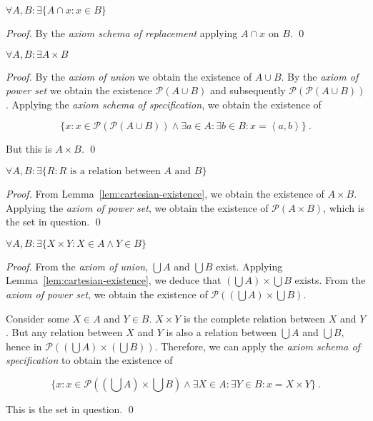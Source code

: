 \documentclass[11pt]{llncs}
\begin{document}
\begin{lemma}
  $\forall A, B: \exists \{A \cap x: x \in B\}$
\end{lemma}
\begin{proof}
  By the \emph{axiom schema of replacement} applying $A \cap x$ on $B$.
  \qed
\end{proof}

\begin{lemma}\label{lem:cartesian-existence}
  $\forall A, B: \exists A \times B$
\end{lemma}
\begin{proof}
  By the \emph{axiom of union} we obtain the existence of $A \cup B$. By the
  \emph{axiom of power set} we obtain the existence $\mathcal{P}(A \cup B)$ and
  subsequently $\mathcal{P}(\mathcal{P}(A \cup B))$. Applying the \emph{axiom
  schema of specification}, we obtain the existence of

  \[
    \{x: x \in \mathcal{P}(\mathcal{P}(A \cup B)) \land \exists a \in A: \exists b \in B: x = \left<a, b\right>\}
    ~.
  \]

  But this is $A \times B$.
  \qed
\end{proof}

\begin{lemma}\label{lem:simple-relations-existence}
  $\forall A, B: \exists \{R: R \text{ is a relation between } A \text{ and } B\}$
\end{lemma}
\begin{proof}
  From Lemma~\ref{lem:cartesian-existence}, we obtain the existence of
  $A \times B$. Applying the \emph{axiom of power set}, we obtain the existence
  of $\mathcal{P}(A \times B)$, which is the set in question.
  \qed
\end{proof}

\begin{lemma}\label{lem:all-relations-existence}
  $\forall A, B: \exists \{X \times Y: X \in A \land Y \in B\}$
\end{lemma}
\begin{proof}
  From the \emph{axiom of union}, $\bigcup A$ and $\bigcup B$ exist. Applying
  Lemma~\ref{lem:cartesian-existence}, we deduce that
  $(\bigcup A) \times \bigcup B$ exists. From the \emph{axiom of power set},
  we obtain the existence of $\mathcal{P}((\bigcup A) \times \bigcup B)$.

  Consider some $X \in A$ and $Y \in B$. $X \times Y$ is the complete relation
  between $X$ and $Y$. But any relation between $X$ and $Y$ is also a relation
  between $\bigcup A$ and $\bigcup B$, hence in
  $\mathcal{P}((\bigcup A) \times (\bigcup B))$.
  Therefore, we can apply the \emph{axiom schema of specification} to obtain the
  existence of

  \[
  \{x: x \in \mathcal{P}((\bigcup A) \times \bigcup B) \land \exists X \in A: \exists Y \in B: x = X \times Y\}
  ~.
  \]

  This is the set in question.
  \qed
\end{proof}
\end{document}
